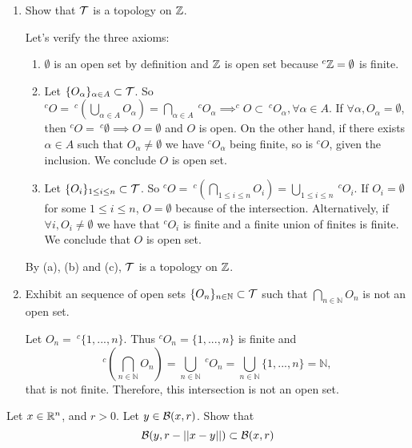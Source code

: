 \begin{enumerate}
    \item Show that $\mathcal{T}$ is a topology on $\mathbb{Z}$.

    Let's verify the three axioms: 

    \begin{enumerate}
        \item $\emptyset$ is an open set by definition and $\mathbb{Z}$ is open set
        because $^c\mathbb{Z} = \emptyset$ is finite. 

        \item Let $\{O_{\alpha}\}_{\alpha \in A}\subset \mathcal{T}$. So 
        $^cO = ~^c\left(\bigcup_{\alpha \in A} O_{\alpha}\right) = \bigcap_{\alpha
        \in A} ~^cO_{\alpha} \implies ^c O \subset ~^cO_{\alpha}, \forall
        \alpha \in A$. If $\forall \alpha, O_{\alpha} = \emptyset$, then $^cO =
        ~^c\emptyset \implies O = \emptyset$   and $O$ is open. On the other
        hand, if there exists $\alpha \in A$ such that $O_{\alpha} \neq
        \emptyset$ we have $^c O_{\alpha}$ being finite, so is $^c O$, given
        the inclusion. We conclude $O$ is open set. 
        
        \item Let $\{O_{i}\}_{1 \le i \le n} \subset \mathcal{T}$. So 
        $^cO = ~^c\left(\bigcap_{1 \le i \le n} O_i\right) = \bigcup_{1 \le i
        \le n} ~^cO_i$. If $O_i = \emptyset$ for some $1 \le i \le n$, $O =
        \emptyset$ because of the intersection. Alternatively, if $\forall i,
        O_i \neq \emptyset$ we have that $^cO_i$ is finite and a finite union
        of finites is finite. We conclude that $O$ is open set.
    \end{enumerate}
    By (a), (b) and (c), $\mathcal{T}$ is a topology on $\mathbb{Z}$. 

    \item Exhibit an sequence of open sets $\{O_n\}_{n\in\mathbb{N}} \subset
    \mathcal{T}$ such that $\bigcap_{n \in \mathbb{N}} O_n$ is not an open
    set.

    Let $O_n = ~^c\{1, ..., n\}$. Thus $^c O_n = \{1,...,n\}$ is finite and
    $$^c\left(\bigcap_{n \in \mathbb{N}} O_n\right) = \bigcup_{n \in
    \mathbb{N}} ~^cO_n = \bigcup_{n \in
    \mathbb{N}} \{1,...,n\} = \mathbb{N},$$
    that is not finite. Therefore, this intersection is not an open set.     
    
\end{enumerate}

\noindent\linia

\begin{exercise}
    Let $x \in \mathbb{R}^n$, and $r > 0$. Let $y \in \mathcal{B}(x, r)$. Show that
    $$\mathcal{B}(y,r - ||x-y||) \subset \mathcal{B}(x,r)$$
\end{exercise}

